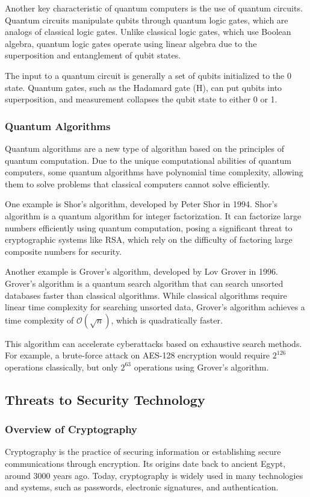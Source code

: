 \documentclass[10pt]{article}
\begin{document}
    Another key characteristic of quantum computers is the use of quantum circuits. Quantum circuits manipulate qubits through quantum logic gates, which are analogs of classical logic gates. Unlike classical logic gates, which use Boolean algebra, quantum logic gates operate using linear algebra due to the superposition and entanglement of qubit states.

    The input to a quantum circuit is generally a set of qubits initialized to the 0 state. Quantum gates, such as the Hadamard gate (H), can put qubits into superposition, and measurement collapses the qubit state to either 0 or 1.

    \subsubsection{Quantum Algorithms}
    Quantum algorithms are a new type of algorithm based on the principles of quantum computation. Due to the unique computational abilities of quantum computers, some quantum algorithms have polynomial time complexity, allowing them to solve problems that classical computers cannot solve efficiently.

    One example is Shor's algorithm, developed by Peter Shor in 1994. Shor's algorithm is a quantum algorithm for integer factorization. It can factorize large numbers efficiently using quantum computation, posing a significant threat to cryptographic systems like RSA, which rely on the difficulty of factoring large composite numbers for security.

    Another example is Grover's algorithm, developed by Lov Grover in 1996. Grover's algorithm is a quantum search algorithm that can search unsorted databases faster than classical algorithms. While classical algorithms require linear time complexity for searching unsorted data, Grover's algorithm achieves a time complexity of \(\mathcal{O}(\sqrt{n})\), which is quadratically faster.

    This algorithm can accelerate cyberattacks based on exhaustive search methods. For example, a brute-force attack on AES-128 encryption would require \(2^{126}\) operations classically, but only \(2^{63}\) operations using Grover's algorithm.

    \subsection{Threats to Security Technology}
    \subsubsection{Overview of Cryptography}
    Cryptography is the practice of securing information or establishing secure communications through encryption. Its origins date back to ancient Egypt, around 3000 years ago. Today, cryptography is widely used in many technologies and systems, such as passwords, electronic signatures, and authentication.
\end{document}
